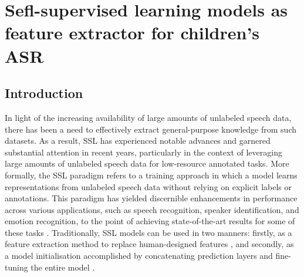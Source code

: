 \chapter{Sefl-supervised learning models as feature extractor for children's \ac{ASR}}
\label{chapter:appendixB}

\section{Introduction}
In light of the increasing availability of large amounts of unlabeled speech data, there has been a need to effectively extract general-purpose knowledge from such datasets. As a result, \ac{SSL} has experienced notable advances and garnered substantial attention in recent years, particularly in the context of leveraging large amounts of unlabeled speech data for low-resource annotated tasks. More formally, the \ac{SSL} paradigm refers to a training approach in which a model learns representations from unlabeled speech data without relying on explicit labels or annotations. This paradigm has yielded discernible enhancements in performance across various applications, such as speech recognition, speaker identification, and emotion recognition, to the point of achieving state-of-the-art results for some of these tasks \cite{baevski2020wav2vec}. Traditionally, \ac{SSL} models can be used in two manners: firstly, as a feature extraction method to replace human-designed features \cite{yang21c_interspeech,chang2021exploration}, and secondly, as a model initialisation accomplished by concatenating prediction layers and fine-tuning the entire model \cite{fan2022draft,jain2023wav2vec2,wang2021fine,li2021accent}.

